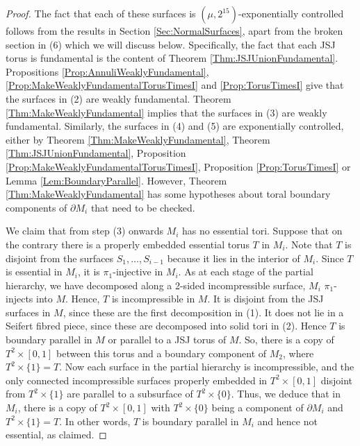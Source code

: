 \documentclass[oneside]{amsart}
\numberwithin{equation}{section}
\theoremstyle{plain}
\theoremstyle{definition}
\begin{document}
\begin{proof}
The fact that each of these surfaces is $(\mu,2^{15})$-exponentially controlled follows from the results in Section \ref{Sec:NormalSurfaces}, apart from the broken section in (6) which we will discuss below. Specifically, the fact that each JSJ torus is fundamental is the content of Theorem \ref{Thm:JSJUnionFundamental}. Propositions \ref{Prop:AnnuliWeaklyFundamental}, \ref{Prop:MakeWeaklyFundamentalTorusTimesI} and \ref{Prop:TorusTimesI} give that the surfaces in (2) are weakly fundamental. Theorem \ref{Thm:MakeWeaklyFundamental} implies that the surfaces in (3) are weakly fundamental. Similarly, the surfaces in (4) and (5) are exponentially controlled, either by Theorem \ref{Thm:MakeWeaklyFundamental}, Theorem \ref{Thm:JSJUnionFundamental}, Proposition \ref{Prop:MakeWeaklyFundamentalTorusTimesI}, Proposition \ref{Prop:TorusTimesI} or Lemma \ref{Lem:BoundaryParallel}. 
However, Theorem \ref{Thm:MakeWeaklyFundamental} has some hypotheses about toral boundary components of $\partial M_i$ that need to be checked.

We claim that from step (3) onwards $M_i$ has no essential tori. Suppose that on the contrary there is a properly embedded essential torus $T$ in $M_i$. Note that $T$ is disjoint from the surfaces $S_1, \dots, S_{i-1}$ because it lies in the interior of $M_i$. Since $T$ is essential in $M_i$, it is $\pi_1$-injective in $M_i$. As at each stage of the partial hierarchy, we have decomposed along a 2-sided incompressible surface, $M_i$ $\pi_1$-injects into $M$. Hence, $T$ is incompressible in $M$. It is disjoint from the JSJ surfaces in $M$, since these are the first decomposition in (1). It does not lie in a Seifert fibred piece, since these are decomposed into solid tori in (2). Hence $T$ is boundary parallel in $M$ or parallel to a JSJ torus of $M$. So, there is a copy of $T^2 \times [0,1]$ between this torus and a boundary component of $M_2$, where $T^2 \times \{ 1 \} = T$. Now each surface in the partial hierarchy is incompressible, and the only connected incompressible surfaces properly embedded in $T^2 \times [0,1]$ disjoint from $T^2 \times \{ 1 \}$ are parallel to a subsurface of $T^2 \times \{ 0 \}$. Thus, we deduce that in $M_i$, there is a copy of $T^2 \times [0,1]$ with $T^2 \times \{ 0 \}$ being a component of $\partial M_i$ and $T^2 \times \{ 1 \} = T$. In other words, $T$ is boundary parallel in $M_i$ and hence not essential, as claimed.


\end{proof}
\end{document}
